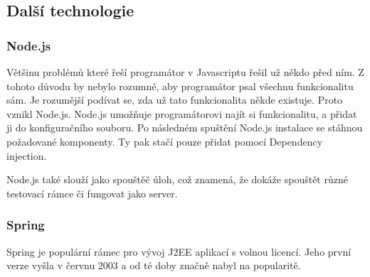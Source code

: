 \documentclass[czech,master,public,dept460,male,cpdeclaration,twoside]{diploma}
\begin{document}
\subsection{Další technologie}

\subsubsection{Node.js}
Většinu problémů které řeší programátor v Javascriptu řešil už někdo před ním. Z tohoto důvodu by nebylo rozumné, aby programátor psal všechnu funkcionalitu sám. Je rozumější podívat se, zda už tato funkcionalita někde existuje. Proto vznikl Node.js. Node.js umožňuje programátorovi najít si funkcionalitu, a přidat ji do konfiguračního souboru. Po následném spuštění Node.js instalace se stáhnou požadované komponenty. Ty pak stačí pouze přidat pomocí Dependency injection.

Node.js také slouží jako spouštěč úloh, což znamená, že dokáže spouštět různé testovací rámce či fungovat jako server.

\subsubsection{Spring}
Spring je populární rámec pro vývoj J2EE aplikací s volnou licencí. Jeho první verze vyšla v červnu 2003 a od té doby značně nabyl na popularitě. 
\end{document}

